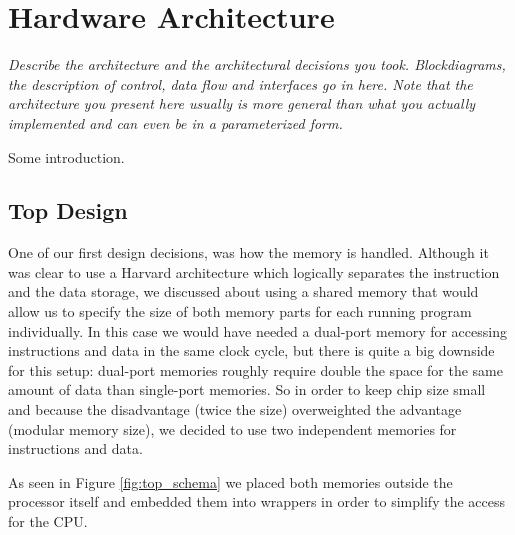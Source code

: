 
\chapter{Hardware Architecture}
\textit{Describe the architecture and the architectural decisions you
took. Blockdiagrams, the description of control, data flow and
interfaces go in here. Note that the architecture you present here
usually is more general than what you actually implemented and can
even be in a parameterized form.}

Some introduction.


\section{Top Design}
\label{sec:top_design}

One of our first design decisions, was how the memory is handled. Although it was clear to use a Harvard architecture which logically separates the instruction and the data storage, we discussed about using a shared memory that would allow us to specify the size of both memory parts for each running program individually. In this case we would have needed a dual-port memory for accessing instructions and data in the same clock cycle, but there is quite a big downside for this setup: dual-port memories roughly require double the space for the same amount of data than single-port memories. So in order to keep chip size small and because the disadvantage (twice the size) overweighted the advantage (modular memory size), we decided to use two independent memories for instructions and data.

As seen in Figure \ref{fig:top_schema} we placed both memories outside the processor itself and embedded them into wrappers in order to simplify the access for the CPU.

